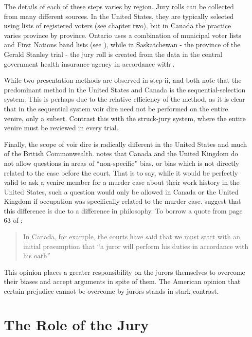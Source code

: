 The details of each of these steps varies by region. Jury rolls can be collected from many different sources. In the United
States, they are typically selected using lists of registered voters (see \cite{vandykejurysel} chapter two), but in Canada the
practice varies province by province. Ontario uses a combination of municipal voter lists and First Nations band lists (see
\cite{ontariojuryroll}), while in Saskatchewan - the province of the Gerald Stanley trial - the jury roll is created from the
data in the central government health insurance agency in accordance with \cite{saskjuryact}.

While two presentation methods are observed in step ii, \cite{ford2010} and \cite{vandykejurysel} both note that the predominant
method in the United States and Canada is the sequential-selection system. This is perhaps due to the relative efficiency of the
method, as it is clear that in the sequential system voir dire need not be performed on the entire venire, only a subset. Contrast
this with the struck-jury system, where the entire venire must be reviewed in every trial.

Finally, the scope of voir dire is radically different in the United States and much of the British
Commonwealth. \cite{vandykejurysel} notes that Canada and the United Kingdom do not allow questions in areas of ``non-specific''
bias, or bias which is not directly related to the case before the court. That is to say, while it would be perfectly valid to ask
a venire member for a murder case about their work history in the United States, such a question would only be allowed in Canada
or the United Kingdom if occupation was specifically related to the murder case. \cite{hansvidjudging} suggest that this
difference is due to a difference in philosophy. To borrow a quote from page 63 of \cite{hansvidjudging}:

\begin{quote}
  \centering
  In Canada, for example, the courts have said that we must start with an initial presumption that ``a juror will perform his
  duties in accordance with his oath''
\end{quote}

This opinion places a greater responsibility on the jurors themselves to overcome their biases and accept arguments in spite of
them. The American opinion that certain prejudice cannot be overcome by jurors stands in stark contrast.

\section{The Role of the Jury} \label{sec:rolejur}

